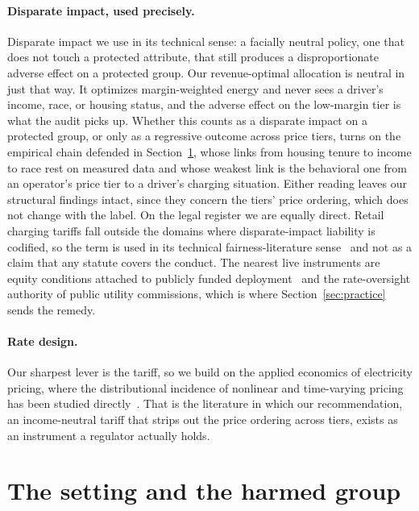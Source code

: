 \documentclass[manuscript, screen, review, anonymous]{acmart}
\begin{document}
\paragraph{Disparate impact, used precisely.}
\label{sec:disparate}
Disparate impact we use in its technical sense: a facially neutral policy, one that does not touch a protected attribute, that still produces a disproportionate adverse effect on a protected group. Our revenue-optimal allocation is neutral in just that way. It optimizes margin-weighted energy and never sees a driver's income, race, or housing status, and the adverse effect on the low-margin tier is what the audit picks up. Whether this counts as a disparate impact on a protected group, or only as a regressive outcome across price tiers, turns on the empirical chain defended in Section~\ref{sec:grounding}, whose links from housing tenure to income to race rest on measured data and whose weakest link is the behavioral one from an operator's price tier to a driver's charging situation. Either reading leaves our structural findings intact, since they concern the tiers' price ordering, which does not change with the label. On the legal register we are equally direct. Retail charging tariffs fall outside the domains where disparate-impact liability is codified, so the term is used in its technical fairness-literature sense~\cite{feldman2015certifying} and not as a claim that any statute covers the conduct. The nearest live instruments are equity conditions attached to publicly funded deployment~\cite{fhwa2023nevi} and the rate-oversight authority of public utility commissions, which is where Section~\ref{sec:practice} sends the remedy.

\paragraph{Rate design.}
Our sharpest lever is the tariff, so we build on the applied economics of electricity pricing, where the distributional incidence of nonlinear and time-varying pricing has been studied directly~\cite{borenstein2012redistributional,burger2020efficiency}. That is the literature in which our recommendation, an income-neutral tariff that strips out the price ordering across tiers, exists as an instrument a regulator actually holds.

\section{The setting and the harmed group}
\label{sec:grounding}
\end{document}
